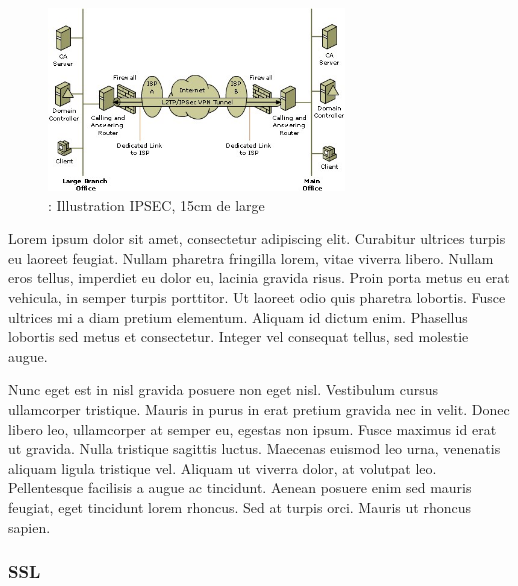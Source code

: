 \documentclass[a4paper,12pt]{report}
\begin{document}
\begin{figure}[H]
  \centering
  \includegraphics[width=0.7\textwidth]{image/images/illustrationipsec}
  \caption{: Illustration IPSEC, 15cm de large}
\end{figure}

Lorem ipsum dolor sit amet, consectetur adipiscing elit. Curabitur ultrices turpis eu laoreet feugiat. Nullam pharetra fringilla lorem, vitae viverra libero. Nullam eros tellus, imperdiet eu dolor eu, lacinia gravida risus. Proin porta metus eu erat vehicula, in semper turpis porttitor. Ut laoreet odio quis pharetra lobortis. Fusce ultrices mi a diam pretium elementum. Aliquam id dictum enim. Phasellus lobortis sed metus et consectetur. Integer vel consequat tellus, sed molestie augue.

Nunc eget est in nisl gravida posuere non eget nisl. Vestibulum cursus ullamcorper tristique. Mauris in purus in erat pretium gravida nec in velit. Donec libero leo, ullamcorper at semper eu, egestas non ipsum. Fusce maximus id erat ut gravida. Nulla tristique sagittis luctus. Maecenas euismod leo urna, venenatis aliquam ligula tristique vel. Aliquam ut viverra dolor, at volutpat leo. Pellentesque facilisis a augue ac tincidunt. Aenean posuere enim sed mauris feugiat, eget tincidunt lorem rhoncus. Sed at turpis orci. Mauris ut rhoncus sapien.

\subsubsection{SSL}   %
\end{document}
